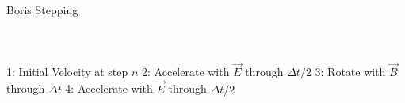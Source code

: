 \documentclass[aspectratio=169, 16pt]{beamer}
\begin{document}
\begin{frame}{Boris Stepping}
\begin{columns}
\begin{figure}[H]
      \end{figure}
  \end{columns}
  \vspace{1cm}
  \begin{columns}
    1: Initial Velocity at step $n$
    2: Accelerate with $\vec{E}$ through $\Delta t/2$
    3: Rotate with $\vec{B}$ through $\Delta t$
    4: Accelerate with $\vec{E}$ through $\Delta t/2$
  \end{columns}
\end{frame}
\end{document}
